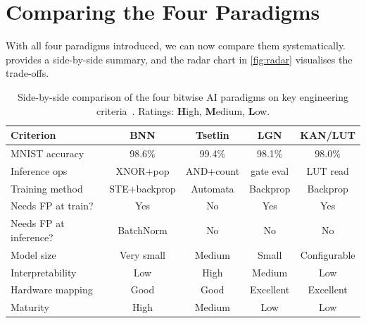 \section{Comparing the Four Paradigms}
\label{sec:comparison}

With all four paradigms introduced, we can now compare them
systematically.  provides a side-by-side
summary, and the radar chart in \cref{fig:radar} visualises the
trade-offs.

\begin{table}[htbp]
\centering
\caption{Side-by-side comparison of the four bitwise AI paradigms
  on key engineering criteria~\cite{courbariaux2016bnn, granmo2018tsetlin, petersen2022difflogic, liu2024kan}. Ratings: \textbf{H}igh, \textbf{M}edium,
  \textbf{L}ow.}
\label{tab:paradigm-comparison}
\small
\begin{tabular}{@{}p{2.8cm}cccc@{}}
  \toprule
  \textbf{Criterion} & \textbf{BNN} & \textbf{Tsetlin} &
    \textbf{LGN} & \textbf{KAN/LUT} \\
  \midrule
  MNIST accuracy & 98.6\% & 99.4\% & 98.1\% & 98.0\% \\
  Inference ops & XNOR+pop & AND+count & gate eval & LUT read \\
  Training method & STE+backprop & Automata & Backprop & Backprop \\
  Needs FP at train? & Yes & No & Yes & Yes \\
  Needs FP at inference? & BatchNorm & No & No & No \\
  Model size & Very small & Medium & Small & Configurable \\
  Interpretability & Low & High & Medium & Low \\
  Hardware mapping & Good & Good & Excellent & Excellent \\
  Maturity & High & Medium & Low & Low \\
  \bottomrule
\end{tabular}
\end{table}

